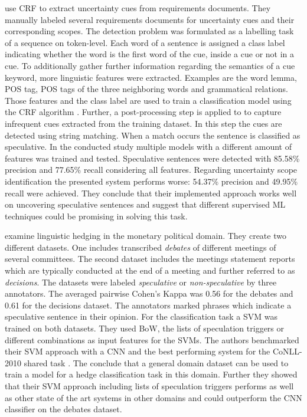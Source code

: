\textcite{Yang:2012} use \ac{CRF} to extract uncertainty cues from requirements documents.
They manually labeled several requirements documents for uncertainty cues and their corresponding scopes.
The detection problem was formulated as a labelling task of a sequence on token-level.
Each word of a sentence is assigned a class label indicating whether the word is the first word of the cue, inside a cue or not in a cue.
To additionally gather further information regarding the semantics of a cue keyword, more linguistic features were extracted.
Examples are the word lemma, \ac{POS} tag, \ac{POS} tags of the three neighboring words and grammatical relations.
Those features and the class label are used to train a classification model using the \ac{CRF} algorithm \parencite{Lafferty:2001}.
Further, a post-processing step is applied to to capture infrequent cues extracted from the training dataset.
In this step the cues are detected using string matching.
When a match occurs the sentence is classified as speculative.
In the conducted study multiple models with a different amount of features was trained and tested.
Speculative sentences were detected with 85.58\% precision and 77.65\% recall considering all features.
Regarding uncertainty scope identification the presented system performs worse: 54.37\% precision and 49.95\% recall were achieved.
They conclude that their implemented approach works well on uncovering speculative sentences and suggest that different supervised \ac{ML} techniques could be promising in solving this task.

\textcite{Stajner:2017} examine linguistic hedging in the monetary political domain.
They create two different datasets.
One includes transcribed \textit{debates} of different meetings of several committees.
The second dataset includes the meetings statement reports which are typically conducted at the end of a meeting and further referred to as \textit{decisions}.
The datasets were labeled \textit{speculative} or \textit{non-speculative} by three annotators.
The averaged pairwise Cohen's Kappa \parencite{Cohen:1960} was 0.56 for the debates and 0.61 for the decisions dataset.
The annotators marked phrases which indicate a speculative sentence in their opinion.
For the classification task a \ac{SVM} was trained on both datasets.
They used \ac{BoW}, the lists of speculation triggers or different combinations as input features for the \acp{SVM}.
The authors benchmarked their \ac{SVM} approach with a \ac{CNN} and the best performing system for the CoNLL-2010 shared task \parencite{Farkas:2010}.
The conclude that a general domain dataset can be used to train a model for a hedge classification task in this domain.
Further they showed that their \ac{SVM} approach including lists of speculation triggers performs as well as other state of the art systems in other domains and could outperform the \ac{CNN} classifier on the debates dataset.
